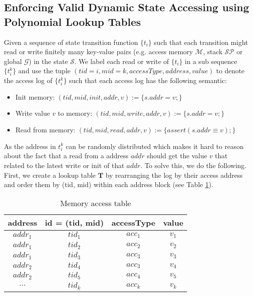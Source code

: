 \subsection{Enforcing Valid Dynamic State Accessing using Polynomial Lookup Tables}
Given a sequence of state transition function $\{t_i\}$ such that each transition might read or write finitely many key-value pairs (e.g. access memory $\mathcal{M}$, stack $\mathcal{SP}$ or global $\mathcal{G}$) in the state $\mathcal{S}$. We label each read or write of $\{t_i\}$ in a sub sequence $\{t_i^k\}$ and use the tuple $(tid=i, mid=k, accessType, address, value)$ to denote the access log of $\{t_i^k\}$ such that each access log has the following semantic:
\begin{itemize}
    \item Init memory: $(tid, mid, init, addr, v ) := \{ s.addr = v; \}$
    \item Write value $v$ to memory: $(tid, mid, write, addr, v) := \{ s.addr = v; \}$
    \item Read from memory: $(tid, mid, read, addr, v) := \{assert(s.addr \equiv v);\}$
\end{itemize}

As the address in $t_i^k$ can be randomly distributed which makes it hard to reason about the fact that a read from a address $addr$ should get the value $v$ that related to the latest write or init of that $addr$. To solve this, we do the following. First, we create a lookup table $\mathbf{T}$ by rearranging the log by their access address and order them by (tid, mid) within each address block (see Table \ref{tbl:rw-table}).
\begin{table}[!h]
\begin{center}
\caption{Memory access table}
\label{tbl:rw-table}
\begin{tabular}{ | c | c | c | c | }
  \hline
  address & id = (tid, mid) & accessType & value \\ 
  \hline
 $addr_1$ & $tid_1$ &  $acc_1$ & $v_1$ \\  
 $addr_1$ & $tid_2$ &  $acc_2$ & $v_2$ \\
  $addr_1$ & $tid_3$ &  $acc_3$ & $v_3$ \\  
 \hline
 $addr_2$ & $tid_4$ &  $acc_3$ & $v_4$ \\  
 $addr_2$ & $tid_5$ & $acc_4$ & $v_5$ \\
 \hline
 $\cdots$ & $tid_k$ & $acc_k$ & $v_k$ \\
 \hline
\end{tabular}

\end{center}
\end{table}

